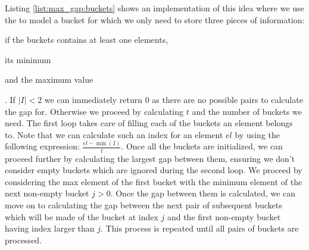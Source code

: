 Listing \ref{list:max_gap:buckets} shows an implementation of this idea where we use the
 to model a bucket for which we only need to store three pieces of information:
\begin{enumerate*}
	\item if the buckets contains at least one elements,
	\item its minimum
	\item and the maximum value
\end{enumerate*}.
If $|I| < 2$ we can immediately return $0$ as there are
no possible pairs to calculate the gap for. Otherwise we proceed by calculating $t$ and the number
of buckets we need. The first loop takes care of filling each of the buckets an element belongs to.
Note that we can calculate such an index for an element $el$ by using the following expression:
$\frac{el- \min(I)}{t}$. Once all the buckets are initialized, we can proceed further by calculating
the largest gap between them,  ensuring we don't consider empty buckets which are ignored
during the second loop. We proceed by considering the max element of the first bucket with the
minimum element of the next non-empty bucket $j > 0$. Once the gap between them is calculated, we
can move on to calculating the gap between the next pair of subsequent buckets which will be made of
the bucket at index $j$ and the first non-empty bucket having index larger than $j$. This process is
repeated until all pairs of buckets are processed.
